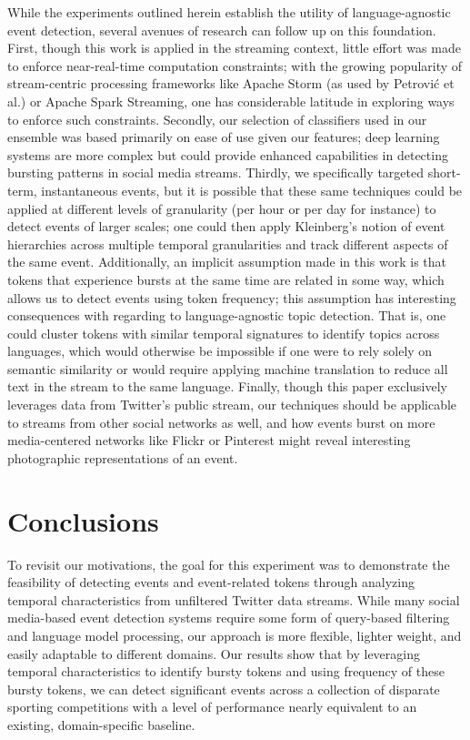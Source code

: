 \documentclass{acm_proc_article-sp}
\begin{document}
While the experiments outlined herein establish the utility of language-agnostic event detection, several avenues of research can follow up on this foundation.
First, though this work is applied in the streaming context, little effort was made to enforce near-real-time computation constraints; with the growing popularity of stream-centric processing frameworks like Apache Storm (as used by Petrovi\'{c} et al.) or Apache Spark Streaming, one has considerable latitude in exploring ways to enforce such constraints.
Secondly, our selection of classifiers used in our ensemble was based primarily on ease of use given our features; deep learning systems are more complex but could provide enhanced capabilities in detecting bursting patterns in social media streams.
Thirdly, we specifically targeted short-term, instantaneous events, but it is possible that these same techniques could be applied at different levels of granularity (per hour or per day for instance) to detect events of larger scales; one could then apply Kleinberg's notion of event hierarchies across multiple temporal granularities and track different aspects of the same event.
Additionally, an implicit assumption made in this work is that tokens that experience bursts at the same time are related in some way, which allows us to detect events using token frequency; this assumption has interesting consequences with regarding to language-agnostic topic detection.
That is, one could cluster tokens with similar temporal signatures to identify topics across languages, which would otherwise be impossible if one were to rely solely on semantic similarity or would require applying machine translation to reduce all text in the stream to the same language.
Finally, though this paper exclusively leverages data from Twitter's public stream, our techniques should be applicable to streams from other social networks as well, and how events burst on more media-centered networks like Flickr or Pinterest might reveal interesting photographic representations of an event.

\section{Conclusions}
\label{sect:conlusions}

To revisit our motivations, the goal for this experiment was to demonstrate the feasibility of detecting events and event-related tokens through analyzing temporal characteristics from unfiltered Twitter data streams.
While many social media-based event detection systems require some form of query-based filtering and language model processing, our approach is more flexible, lighter weight, and easily adaptable to different domains.
Our results show that by leveraging temporal characteristics to identify bursty tokens and using frequency of these bursty tokens, we can detect significant events across a collection of disparate sporting competitions with a level of performance nearly equivalent to an existing, domain-specific baseline.
\end{document}
